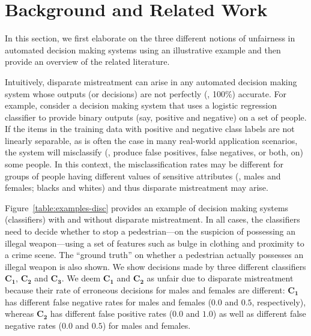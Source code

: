 \documentclass[letterpaper]{sig-alternate-2013}
\newcommand{\xhdr}[1]{\vspace{0.5mm}\noindent{{\bf #1.}}}
\begin{document}
\section{Background and Related Work}





\noindent In this section, we first elaborate on the three different notions of unfairness
in automated decision making systems using an illustrative example and then provide
an overview of the related literature.

\vspace{1.5mm}
\xhdr{Disparate mistreatment} Intuitively, disparate mistreatment can arise in any automated
decision making system whose outputs (or decisions) are not perfectly (\ie, 100\%) accurate.
For example, consider a decision making system that uses a logistic regression classifier to
provide binary outputs (say, positive and negative) on a set of people.
If the items in the training data with positive and negative class labels
are not linearly separable, as is often the
case in many real-world application scenarios, the system will misclassify (\ie, produce false positives,
false negatives, or both, on) some people.
In this context, the misclassification rates may be different for groups of people having different values
of sensitive attributes (\eg, males and females; blacks and whites) and thus disparate mistreatment
may arise.

Figure~\ref{table:examples-disc} provides an example of decision making systems (classifiers) with and
without disparate mistreatment.
In all cases, the classifiers need to decide whether to stop a pedestrian---on the suspicion
of possessing an illegal weapon---using a set of
features such as bulge in clothing and proximity to a crime scene.
The ``ground truth'' on whether
a pedestrian actually possesses an illegal weapon is also shown.
We show decisions made by three different classifiers $\mathbf{C_1}$, $\mathbf{C_2}$ and $\mathbf{C_3}$.
We deem $\mathbf{C_1}$ and $\mathbf{C_2}$ as unfair due to disparate mistreatment because their rate of
erroneous decisions for males and females are different: $\mathbf{C_1}$ has different false negative rates for
males and females ($0.0$ and $0.5$, respectively), whereas $\mathbf{C_2}$ has different false positive rates
($0.0$ and $1.0$) as well as different false negative rates ($0.0$ and $0.5$) for males and females.
\end{document}
